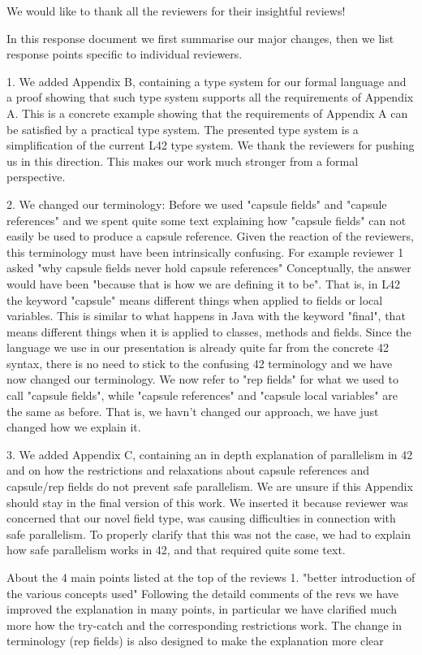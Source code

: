 We would like to thank all the reviewers for their insightful reviews!

In this response document we first summarise our major changes, then we list response points specific to individual reviewers.

1.  We added Appendix B, containing a type system for our formal language and a proof showing that such type system
supports all the requirements of Appendix A. This is a concrete example showing that the requirements of Appendix A
can be satisfied by a practical type system. The presented type system is a simplification of the current L42 type system.
We thank the reviewers for pushing us in this direction. This makes our work much stronger from a formal perspective.

2. We changed our terminology:
Before we used "capsule fields" and "capsule references" and we spent quite some text explaining how 
"capsule fields" can not easily be used to produce a capsule reference. Given the reaction of the reviewers, this terminology must have been
intrinsically confusing.
For example reviewer 1 asked "why capsule fields never hold capsule references"
Conceptually, the answer would have been "because that is how we are defining it to be".
That is, in L42 the keyword "capsule" means different things when applied to fields or local variables.
This is similar to what happens in Java with the keyword "final", that means different things when it is applied to classes, methods and fields.
Since the language we use in our presentation is already quite far from the concrete 42 syntax, there is no need to stick to the confusing 42 terminology and
we have now changed our terminology.
We now refer to "rep fields" for what we used to call "capsule fields",
while "capsule references" and "capsule local variables" are the same as before.
That is, we havn't changed our approach, we have just changed how we explain it.

3. We added Appendix C, containing an in depth explanation of parallelism in 42 and on how the restrictions and relaxations
 about capsule references and capsule/rep fields do not prevent safe parallelism.
We are unsure if this Appendix should stay in the final version of this work. 
We inserted it because reviewer was concerned that our novel field type, was causing difficulties in connection with safe parallelism.
To properly clarify that this was not the case, we had to explain how safe parallelism works in 42, and that required quite some text.

About the 4 main points listed at the top of the reviews
1. "better introduction of the various concepts used"
Following the detaild comments of the revs we have improved the explanation in many points, in particular we have clarified much more how the
try-catch and the corresponding restrictions work. The change in terminology (rep fields) is also designed to make the explanation more clear

